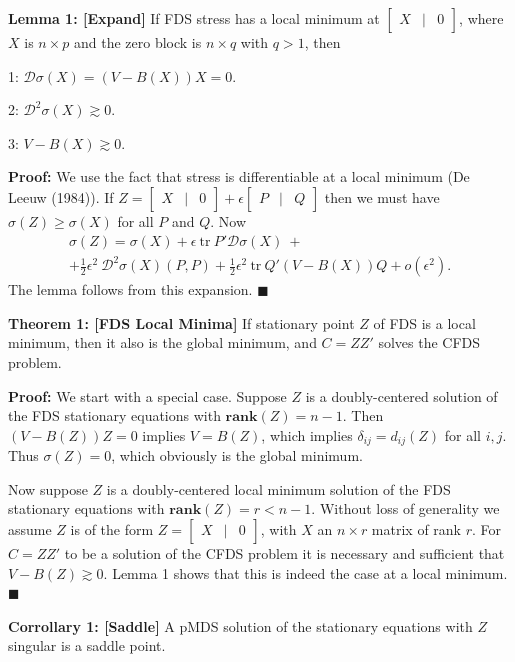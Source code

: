 \documentclass[
  12pt,
]{article}
\begin{document}
\textbf{Lemma 1: {[}Expand{]}} If FDS stress has a local minimum at
\(\begin{bmatrix}X&\mid&0\end{bmatrix}\), where \(X\) is \(n\times p\)
and the zero block is \(n\times q\) with \(q>1\), then

1: \(\mathcal{D}\sigma(X)=(V-B(X))X=0\).

2: \(\mathcal{D}^2\sigma(X)\gtrsim 0\).

3: \(V-B(X)\gtrsim 0\).

\textbf{Proof:} We use the fact that stress is differentiable at a local
minimum (De Leeuw (1984)). If
\(Z=\begin{bmatrix}X&\mid&0\end{bmatrix}+\epsilon\begin{bmatrix}P&\mid&Q\end{bmatrix}\)
then we must have \(\sigma(Z)\geq\sigma(X)\) for all \(P\) and \(Q\).
Now \begin{multline}\label{E:expand}
\sigma(Z)=\sigma(X)+\epsilon\ \text{tr}\ P'\mathcal{D}\sigma(X)\ +\\+\frac12\epsilon^2\ \mathcal{D}^2\sigma(X)(P,P)+\frac12\epsilon^2\ \text{tr}\ Q'(V-B(X))Q+o(\epsilon^2).
\end{multline} The lemma follows from this expansion. \(\blacksquare\)

\textbf{Theorem 1: {[}FDS Local Minima{]}} If stationary point \(Z\) of
FDS is a local minimum, then it also is the global minimum, and
\(C=ZZ'\) solves the CFDS problem.

\textbf{Proof:} We start with a special case. Suppose \(Z\) is a
doubly-centered solution of the FDS stationary equations with
\(\mathbf{rank}(Z)=n-1\). Then \((V-B(Z))Z=0\) implies \(V=B(Z)\), which
implies \(\delta_{ij}=d_{ij}(Z)\) for all \(i,j\). Thus \(\sigma(Z)=0\),
which obviously is the global minimum.

Now suppose \(Z\) is a doubly-centered local minimum solution of the FDS
stationary equations with \(\mathbf{rank}(Z)=r<n-1\). Without loss of
generality we assume \(Z\) is of the form
\(Z=\begin{bmatrix}X&\mid&0\end{bmatrix}\), with \(X\) an \(n\times r\)
matrix of rank \(r\). For \(C=ZZ'\) to be a solution of the CFDS problem
it is necessary and sufficient that \(V-B(Z)\gtrsim 0\). Lemma 1 shows
that this is indeed the case at a local minimum. \(\blacksquare\)

\textbf{Corrollary 1: {[}Saddle{]}} A pMDS solution of the stationary
equations with \(Z\) singular is a saddle point.
\end{document}
